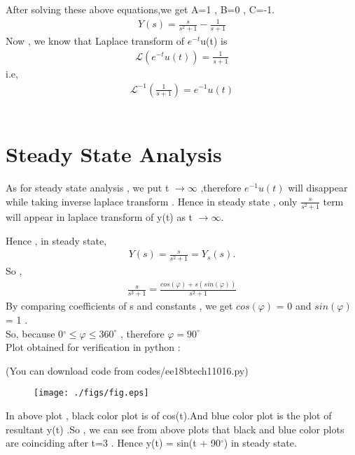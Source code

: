 \begin{enumerate}[label=\thesection.\arabic*.,ref=\thesection.\theenumi]
After solving these above equations,we get A=1 , B=0 , C=-1.   
\begin{align}
Y(s) =  \frac{s}{s^2 + 1} - \frac{1}{s + 1}
\end{align}
Now , we know that Laplace transform of $e^{-t}$u(t) is 
\begin{align}
\mathcal{L}(e^{-t}u(t)) = \frac{1}{s+1}
\end{align}
i.e,
\begin{align}
\mathcal{L}^{-1}(\frac{1}{s+1}) = e^{-1}u(t)
\end{align}
\\
\section{Steady State Analysis}
As for steady state analysis , we put t $\rightarrow\infty$ ,therefore $e^{-1}u(t)$ will disappear while taking inverse laplace transform . Hence in steady state , only $\frac{s}{s^2 + 1}$ term will appear in laplace transform of y(t) as t $\rightarrow\infty$.


Hence , in steady state,
\begin{align}
Y(s) = \frac{s}{s^2 + 1} = Y_s(s) .
\end{align}
So ,	
\begin{align}
\frac{s}{s^2 + 1} = \frac{cos(\varphi) + s(sin(\varphi))}{s^2 + 1}
\end{align}
By comparing coefficients of s and constants , we get $cos(\varphi)$ = 0 and $sin(\varphi)$ = 1 .
\\
So, because 0$^{\circ}\leq\varphi\leq360^{\circ}$ , therefore $\varphi = 90^{\circ}$
\\

Plot obtained for verification in python :

(You can download code from codes/ee18btech11016.py)
\begin{figure}[htp]
	\centering
	\texttt{[image: ./figs/fig.eps]}
	\caption{}
	\label{fig:Phase}
\end{figure}

In above plot , black color plot is of cos(t).And blue color plot is the plot of resultant y(t) .So , we can see from above plots that black and blue color plots are coinciding after t=3 . Hence y(t) = sin(t + 90$^{\circ}$) in steady state.




\end{enumerate}


